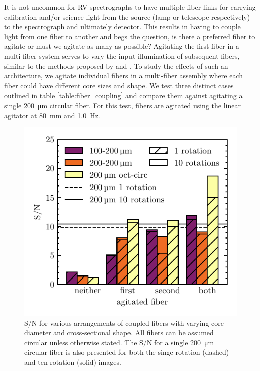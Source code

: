 \documentclass[twocolumn]{emulateapj}
\begin{document}
It is not uncommon for RV spectrographs to have multiple fiber links for carrying calibration and/or science light from the source (lamp or telescope respectively) to the spectrograph and ultimately detector. This results in having to couple light from one fiber to another and begs the question, is there a preferred fiber to agitate or must we agitate as many as possible? Agitating the first fiber in a multi-fiber system serves to vary the input illumination of subsequent fibers, similar to the methods proposed by \citet{Mahadevan2014} and \citet{Halverson2014}. To study the effects of such an architecture, we agitate individual fibers in a multi-fiber assembly where each fiber could have different core sizes and shape. We test three distinct cases outlined in table \ref{table:fiber_coupling} and compare them against agitating a single \SI{200}{\micro\meter} circular fiber. For this test, fibers are agitated using the linear agitator at \SI{80}{\milli\meter} and \SI{1.0}{\hertz}.

\begin{figure}
\centering
	\includegraphics[width=\columnwidth]{images/coupled_fibers.pdf}
	\caption{S/N for various arrangements of coupled fibers with varying core diameter and cross-sectional shape. All fibers can be assumed circular unless otherwise stated. The S/N for a single \SI{200}{\micro\meter} circular fiber is also presented for both the singe-rotation (dashed) and ten-rotation (solid) images.}
\label{fig:coupled_fibers}
\end{figure}
\end{document}
